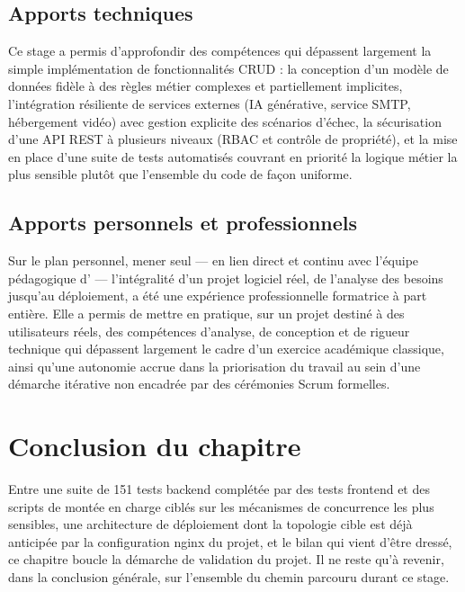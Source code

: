 \subsection{Apports techniques}

Ce stage a permis d'approfondir des compétences qui dépassent largement la
simple implémentation de fonctionnalités CRUD : la conception d'un modèle
de données fidèle à des règles métier complexes et partiellement
implicites, l'intégration résiliente de services externes (IA générative,
service SMTP, hébergement vidéo) avec gestion explicite des scénarios
d'échec, la sécurisation d'une API REST à plusieurs niveaux (RBAC et
contrôle de propriété), et la mise en place d'une suite de tests
automatisés couvrant en priorité la logique métier la plus sensible plutôt
que l'ensemble du code de façon uniforme.

\subsection{Apports personnels et professionnels}

Sur le plan personnel, mener seul --- en lien direct et continu avec
l'équipe pédagogique d'\Entreprise{} --- l'intégralité d'un projet logiciel
réel, de l'analyse des besoins jusqu'au déploiement, a été une expérience
professionnelle formatrice à part entière. Elle a permis de mettre en
pratique, sur un projet destiné à des utilisateurs réels, des compétences
d'analyse, de conception et de rigueur technique qui dépassent largement
le cadre d'un exercice académique classique, ainsi qu'une autonomie
accrue dans la priorisation du travail au sein d'une démarche itérative
non encadrée par des cérémonies Scrum formelles.

\section*{Conclusion du chapitre}
Entre une suite de 151 tests backend complétée par des tests frontend et
des scripts de montée en charge ciblés sur les mécanismes de concurrence
les plus sensibles, une architecture de déploiement dont la topologie
cible est déjà anticipée par la configuration nginx du projet, et le
bilan qui vient d'être dressé, ce chapitre boucle la démarche de
validation du projet. Il ne reste qu'à revenir, dans la conclusion
générale, sur l'ensemble du chemin parcouru durant ce stage.
